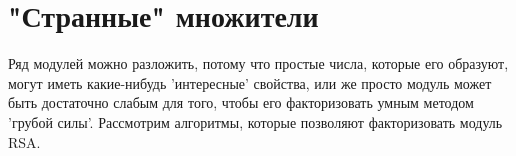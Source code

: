 \documentclass[12pt,a4paper]{scrartcl}
\begin{document}
\section{"Странные" множители}

Ряд модулей можно разложить, потому что простые числа, которые его образуют, могут иметь какие-нибудь 'интересные' свойства, или же просто модуль может быть достаточно слабым для того, чтобы его факторизовать умным методом 'грубой силы'. Рассмотрим алгоритмы, которые позволяют факторизовать модуль RSA. 
\end{document}
